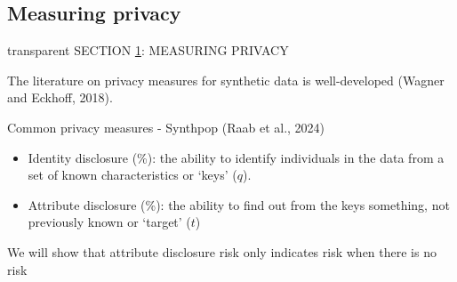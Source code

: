 \documentclass[t,8pt,utfx8]{beamer}
\begin{document}
\begin{spacing}{1.25}


\section{Measuring privacy}\label{sec:privacy}
\begin{frame}[c,plain]
\vskip-4mm
\begin{beamercolorbox}[wd=\boxwidth,ht=22.11mm]{transparent}%
    \vfill%
    \leftinsert%
    \MakeUppercase{Section \ref{sec:privacy}: Measuring privacy
} %
\end{beamercolorbox}
\vskip-3mm

The literature on privacy measures for synthetic data is well-developed (Wagner and Eckhoff, 2018).  

Common privacy measures - Synthpop (Raab et al., 2024)

\begin{itemize}
    \item Identity disclosure (\%): the ability to identify individuals in the data from a set of known characteristics or `keys' ($q$).  
    \item Attribute disclosure (\%): the ability to find out from the keys something, not previously known or `target' ($t$)
\end{itemize}

We will show that attribute disclosure risk only indicates risk when there is no risk


\end{frame}
\end{spacing}
\end{document}
